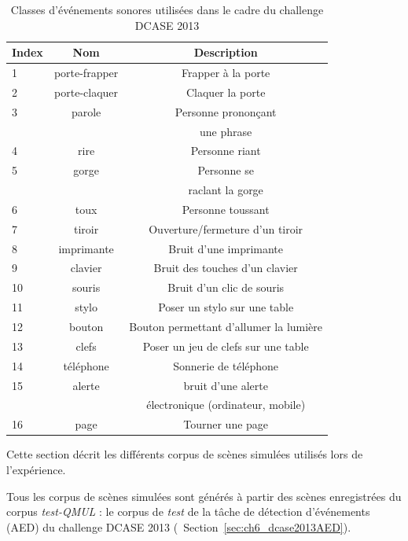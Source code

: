 \begin{table}[t]
\begin{center}
\begin{tabular}{lcc}
\textbf{Index} & \textbf{Nom}  & \textbf{Description}  \\ 
\hline
1   & porte-frapper & Frapper à la porte \\
2   & porte-claquer & Claquer la porte \\
3   & parole        & Personne prononçant \\
    &               &  une phrase \\
4   & rire          & Personne riant  \\    
5   & gorge         & Personne se   \\
    &               & raclant la gorge \\
6   & toux          & Personne toussant \\
7   & tiroir        & Ouverture/fermeture d'un tiroir \\
8   & imprimante    & Bruit d'une imprimante \\
9   & clavier       & Bruit des touches d'un clavier \\
10  & souris        & Bruit d'un clic de souris \\
11  & stylo         & Poser un stylo sur une table \\
12  & bouton        & Bouton permettant d'allumer la lumière \\
13  & clefs         & Poser un jeu de clefs sur une table \\    
14  & téléphone     & Sonnerie de téléphone \\
15  & alerte        & bruit d'une alerte \\
    &               & électronique (ordinateur, mobile) \\
16  & page          & Tourner une page \\     
\hline      
\end{tabular}
\end{center}
\caption{Classes d'événements sonores utilisées dans le cadre du challenge DCASE 2013}
\label{tab:eventDCASE2013}
\end{table}

Cette section décrit les différents corpus de scènes simulées utilisés lors de l'expérience. 

Tous les corpus de scènes simulées sont générés à partir des scènes enregistrées du corpus \emph{test-QMUL} : le corpus de \emph{test} de la tâche de détection d'événements (AED) du challenge DCASE 2013  \citep{giannoulis2013detection} (\cf~Section~\ref{sec:ch6_dcase2013AED}). 

